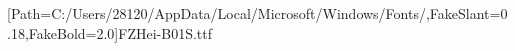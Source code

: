 [Path=C:/Users/28120/AppData/Local/Microsoft/Windows/Fonts/,FakeSlant=0.18,FakeBold=2.0]{FZHei-B01S.ttf}
\newcommand{\heiti}{\CJKfamily{hei}}
\newcommand{\heizhang}{\CJKfamily{heizhang}}
\newcommand{\heijie}{\CJKfamily{heijie}}
\newcommand{\heitiao}{\CJKfamily{heitiao}}
\newcommand{\heibf}{\CJKfamily{heibf}}
\newcommand{\heihao}{\CJKfamily{heihao}}
\newcommand{\heibian}{\CJKfamily{heibian}}
\newcommand{\huabf}{\CJKfamily{huabf}}
\newcommand{\kaishu}{\CJKfamily{kai}}
\newcommand{\fangsong}{\CJKfamily{fangsong}}%
